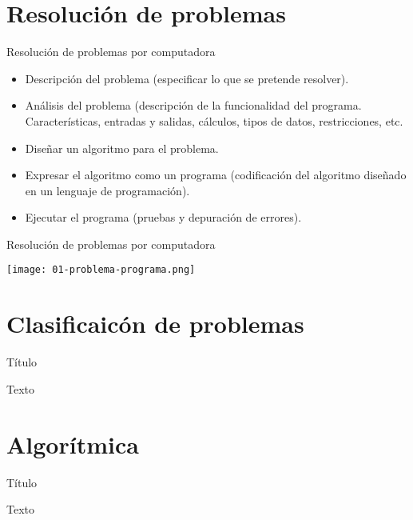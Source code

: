 \section{Resolución de problemas}

\begin{frame}[c]{Resolución de problemas por computadora}
  \begin{itemize}
    \item Descripción del problema (especificar lo que se pretende resolver).
    \item Análisis del problema (descripción de la funcionalidad del programa.
      Características, entradas y salidas, cálculos, tipos de datos,
      restricciones, etc.
    \item Diseñar un algoritmo para el problema.
    \item Expresar el algoritmo como un programa (codificación del algoritmo
      diseñado en un lenguaje de programación).
    \item Ejecutar el programa (pruebas y depuración de errores).
  \end{itemize}
\end{frame}

\begin{frame}[c]{Resolución de problemas por computadora}
  \begin{center}
    \texttt{[image: 01-problema-programa.png]}
  \end{center}
\end{frame}

\section{Clasificaicón de problemas}

\begin{frame}[c]{Título}
    \begin{center}
        Texto
    \end{center}
\end{frame}

\section{Algorítmica}

\begin{frame}[c]{Título}
    \begin{center}
        Texto
    \end{center}
\end{frame}

